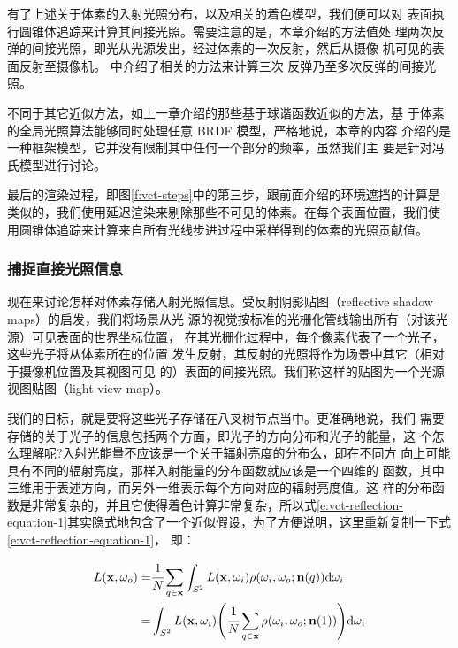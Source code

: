 有了上述关于体素的入射光照分布，以及相关的着色模型，我们便可以对 表面执行圆锥体追踪来计算其间接光照。需要注意的是，本章介绍的方法值处 理两次反弹的间接光照，即光从光源发出，经过体素的一次反射，然后从摄像 机可见的表面反射至摄像机。\cite{a:TheTechnologyofTheTomorrowChildren} 中介绍了相关的方法来计算三次 反弹乃至多次反弹的间接光照。

不同于其它近似方法，如上一章介绍的那些基于球谐函数近似的方法，基 于体素的全局光照算法能够同时处理任意 BRDF 模型，严格地说，本章的内容 介绍的是一种框架模型，它并没有限制其中任何一个部分的频率，虽然我们主 要是针对冯氏模型进行讨论。

最后的渲染过程，即图\ref{f:vct-steps}中的第三步，跟前面介绍的环境遮挡的计算是 类似的，我们使用延迟渲染来剔除那些不可见的体素。在每个表面位置，我们使 用圆锥体追踪来计算来自所有光线步进过程中采样得到的体素的光照贡献值。



\subsubsection{捕捉直接光照信息}
现在来讨论怎样对体素存储入射光照信息。受反射阴影贴图（reflective shadow maps）的启发\cite{a:ReflectiveShadowMaps}，我们将场景从光 源的视觉按标准的光栅化管线输出所有（对该光源）可见表面的世界坐标位置， 在其光栅化过程中，每个像素代表了一个光子，这些光子将从体素所在的位置 发生反射，其反射的光照将作为场景中其它（相对于摄像机位置及其视图可见 的）表面的间接光照。我们称这样的贴图为一个光源视图贴图（light-view map）。

我们的目标，就是要将这些光子存储在八叉树节点当中。更准确地说，我们 需要存储的关于光子的信息包括两个方面，即光子的方向分布和光子的能量，这 个怎么理解呢?入射光能量不应该是一个关于辐射亮度的分布么，即在不同方 向上可能具有不同的辐射亮度，那样入射能量的分布函数就应该是一个四维的 函数，其中三维用于表述方向，而另外一维表示每个方向对应的辐射亮度值。这 样的分布函数是非常复杂的，并且它使得着色计算非常复杂，所以式\ref{e:vct-reflection-equation-1}其实隐式地包含了一个近似假设，为了方便说明，这里重新复制一下式\ref{e:vct-reflection-equation-1}， 即：

\begin{equation}
\begin{aligned}
	L(\mathbf{x},\omega_o)=&\cfrac{1}{N}\sum_{q\in \mathbf{x}}\int_{S^{2}}L(\mathbf{x},\omega_i)\rho(\omega_i,\omega_o;\mathbf{n}(q)){\rm d}\omega_i\\
	=&\int_{S^{2}}L(\mathbf{x},\omega_i)\Biggl(\cfrac{1}{N}\sum_{q\in \mathbf{x}}\rho(\omega_i,\omega_o;\mathbf{n}(1))\Biggl){\rm d}\omega_i
\end{aligned}
\end{equation}

